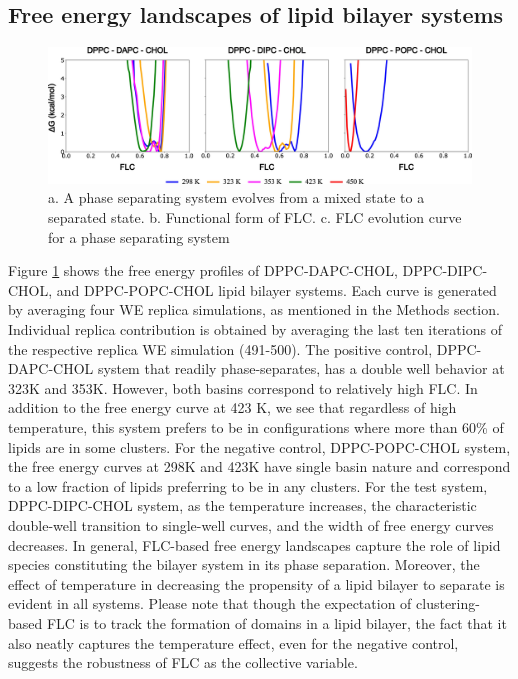\documentclass{biophys-new}
\begin{document}
\subsection*{Free energy landscapes of lipid bilayer systems}

\begin{figure}[hbt!]
\centering
\includegraphics[width=1\linewidth]{Figures/Main/5/placeholder.jpg}
\caption{a. A phase separating system evolves from a mixed state to a separated state. b. Functional form of FLC. c. FLC evolution curve for a phase separating system}
\label{figs5:view}
\end{figure}

Figure \ref{figs5:view} shows the free energy profiles of DPPC-DAPC-CHOL, DPPC-DIPC-CHOL, and DPPC-POPC-CHOL lipid bilayer systems.
Each curve is generated by averaging four WE replica simulations, as mentioned in the Methods section.
Individual replica contribution is obtained by averaging the last ten iterations of the respective replica WE simulation (491-500). 
The positive control, DPPC-DAPC-CHOL system that readily phase-separates, has a double well behavior at 323K and 353K.
However, both basins correspond to relatively high FLC.
In addition to the free energy curve at 423 K, we see that regardless of high temperature, this system prefers to be in configurations where more than 60\% of lipids are in some clusters.
For the negative control, DPPC-POPC-CHOL system, the free energy curves at 298K and 423K have single basin nature and correspond to a low fraction of lipids preferring to be in any clusters.
For the test system, DPPC-DIPC-CHOL system, as the temperature increases, the characteristic double-well transition to single-well curves, and the width of free energy curves decreases.
In general, FLC-based free energy landscapes capture the role of lipid species constituting the bilayer system in its phase separation.
Moreover, the effect of temperature in decreasing the propensity of a lipid bilayer to separate is evident in all systems.
Please note that though the expectation of clustering-based FLC is to track the formation of domains in a lipid bilayer, the fact that it also neatly captures the temperature effect, even for the negative control, suggests the robustness of FLC as the collective variable.
\end{document}
